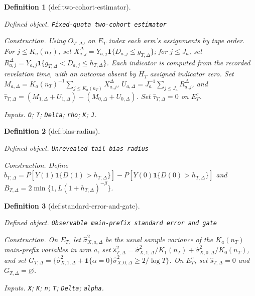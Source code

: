 \documentclass{article}
\newtheorem{definition}{Definition}
\begin{document}
\begin{definition}[def:two-cohort-estimator]\label{def:two-cohort-estimator}
\par\smallskip\noindent\emph{Defined object.} \texttt{Fixed-\allowbreak{}quota two-\allowbreak{}cohort estimator}
\par\smallskip\noindent\emph{Construction.} Using \(O_{T,\Delta}\), on \(E_T\) index each arm's assignments by tape order. For \(j\leq K_a(n_T)\), set \(X_{a,j}^{\Delta}=Y_{a,j}\mathbf 1\{D_{a,j}\leq g_{T,\Delta}\}\); for \(j\leq J_a\), set \(R_{a,j}^{\Delta}=Y_{a,j}\mathbf 1\{g_{T,\Delta}<D_{a,j}\leq h_{T,\Delta}\}\). Each indicator is computed from the recorded revelation time, with an outcome absent by \(H_T\) assigned indicator zero. Set \(M_{a,\Delta}=K_a(n_T)^{-1}\sum_{j\leq K_a(n_T)}X_{a,j}^{\Delta}\), \(U_{a,\Delta}=J_a^{-1}\sum_{j\leq J_a}R_{a,j}^{\Delta}\), and \(\widehat\tau_{T,\Delta}=(M_{1,\Delta}+U_{1,\Delta})-(M_{0,\Delta}+U_{0,\Delta})\). Set \(\widehat\tau_{T,\Delta}=0\) on \(E_T^c\).
\par\smallskip\noindent\emph{Inputs.} \texttt{O}; \texttt{T}; \texttt{Delta}; \texttt{rho}; \texttt{K}; \texttt{J}.
\end{definition}

\begin{definition}[def:bias-radius]\label{def:bias-radius}
\par\smallskip\noindent\emph{Defined object.} \texttt{Unrevealed-\allowbreak{}tail bias radius}
\par\smallskip\noindent\emph{Construction.} Define \(b_{T,\Delta}=P[Y(1)\mathbf 1\{D(1)>h_{T,\Delta}\}]-P[Y(0)\mathbf 1\{D(0)>h_{T,\Delta}\}]\) and \(B_{T,\Delta}=2\min\{1,L(1+h_{T,\Delta})^{-\beta}\}\).
\end{definition}

\begin{definition}[def:standard-error-and-gate]\label{def:standard-error-and-gate}
\par\smallskip\noindent\emph{Defined object.} \texttt{Observable main-\allowbreak{}prefix standard error and gate}
\par\smallskip\noindent\emph{Construction.} On \(E_T\), let \(\widehat\sigma_{X,a,\Delta}^2\) be the usual sample variance of the \(K_a(n_T)\) main-prefix variables in arm \(a\), set \(\widehat s_{T,\Delta}^2=\widehat\sigma_{X,1,\Delta}^2/K_1(n_T)+\widehat\sigma_{X,0,\Delta}^2/K_0(n_T)\), and set \(G_{T,\Delta}=\{\widehat\sigma_{X,1,\Delta}^2+\mathbf 1\{\alpha=0\}\widehat\sigma_{X,0,\Delta}^2\geq2/\log T\}\). On \(E_T^c\), set \(\widehat s_{T,\Delta}=0\) and \(G_{T,\Delta}=\varnothing\).
\par\smallskip\noindent\emph{Inputs.} \texttt{X}; \texttt{K}; \texttt{n}; \texttt{T}; \texttt{Delta}; \texttt{alpha}.
\end{definition}
\end{document}
